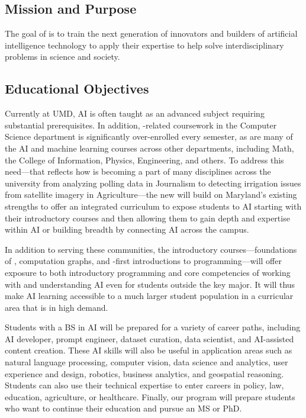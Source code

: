 
\subsection{Mission and Purpose}

The goal of \name{} is to train the next generation of innovators and builders of artificial intelligence technology to apply their expertise to help solve interdisciplinary problems in science and society.

\subsection{Educational Objectives}

Currently at UMD, AI is often taught as an advanced subject requiring substantial prerequisites. In addition, \ai{}-related coursework in the Computer Science department is significantly over-enrolled every semester, as are many of the AI and machine learning courses across other departments, including Math, the College of Information, Physics, Engineering, and others. 
%
To address this need---that reflects how \ai{} is becoming a part of many disciplines across the university from analyzing polling data in Journalism to detecting irrigation issues from satellite imagery in Agriculture---the new \bsai{} will build on Maryland's existing strengths to  offer an integrated curriculum to expose students to AI starting with their introductory courses and then allowing them to gain depth and expertise within AI or building breadth by connecting AI across the campus. 

In addition to serving these communities, the introductory courses---foundations of \ai{}, computation graphs, and \ai{}-first introductions to programming---will offer exposure to both introductory programming and core competencies of working with and understanding AI even for students outside the key major.  It will thus make AI learning accessible to a much larger student population in a curricular area that is in high demand.

Students with a BS in AI will be prepared for a variety of career paths, including AI developer, prompt engineer, dataset curation, data scientist, and AI-assisted content creation.  These AI skills will also be useful in application areas such as natural language processing, computer vision, data science and analytics, user experience and design, robotics, business analytics, and geospatial reasoning. Students can also use their technical expertise to enter careers in policy, law, education, agriculture, or healthcare. Finally, our program will prepare students who want to continue their education and pursue an MS or PhD.


